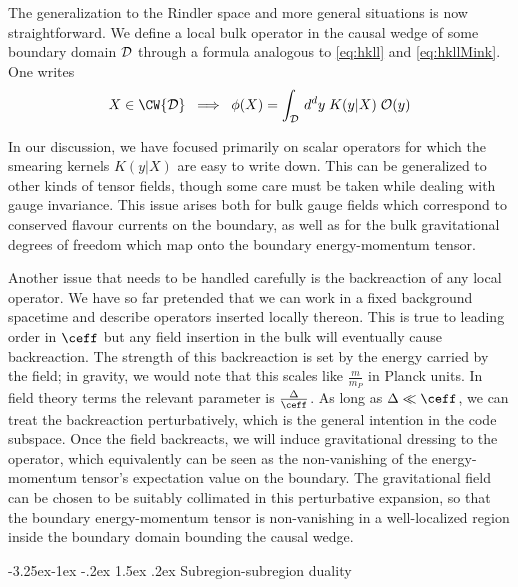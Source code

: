 \documentclass[12pt,openany]{book}
\makeatletter
\renewcommand\subsection{\@startsection{subsection}{2}{\z@}%
                                     {-3.25ex\@plus -1ex \@minus -.2ex}%
                                     {1.5ex \@plus .2ex}%
                                     {\normalfont\bfseries}}
\makeatother
\begin{document}
The generalization to the Rindler space and more general situations is now straightforward. We define a local bulk operator in the causal wedge of some boundary domain ${\cal D}$ through a formula analogous to \eqref{eq:hkll} and \eqref{eq:hkllMink}. One writes
%
\begin{equation}
X \in \CW{{\cal D}} \;\; \Longrightarrow \;\; \phi(X) = \int_{{\cal D}} \, d^dy \; K(y|X)\; {\cal O}(y)
\label{eq:localhkll}
\end{equation}
%

In our discussion, we have focused primarily on scalar operators for which the smearing kernels $K(y|X)$ are easy to write down. This can be generalized to other kinds of tensor fields, though some care must be taken while dealing with gauge invariance. This issue arises both for bulk gauge fields which correspond to  conserved flavour currents on the boundary, as well as for the bulk gravitational degrees of freedom which map onto the boundary energy-momentum tensor.

Another issue that needs to be handled carefully is the backreaction of any local operator. We have so far pretended that we can work in a fixed background spacetime and describe operators inserted locally thereon.  This is true to leading order in $\ceff$ but any field insertion in the bulk will eventually cause backreaction. The strength of this backreaction is set by the energy carried by the field; in gravity, we would note that this scales like $\frac{m}{m_P}$ in Planck units. In field theory terms the relevant parameter is  $\frac{\Delta}{\ceff}$. As long as $\Delta \ll \ceff$, we can treat the backreaction perturbatively, which is the general intention in the code subspace. Once the field backreacts, we will induce gravitational dressing to the operator, which equivalently can be seen as the non-vanishing of the energy-momentum tensor's expectation value on the boundary. The gravitational field can be chosen to be suitably collimated in this perturbative expansion, so that the boundary energy-momentum tensor is non-vanishing in a well-localized region  inside the boundary domain bounding the causal wedge.

\subsection{Subregion-subregion duality}
\label{sec:subregions}
\end{document}
